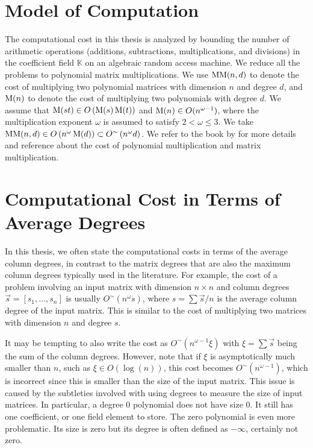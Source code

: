 \section{Model of Computation}

The computational cost in this thesis is analyzed by bounding the
number of arithmetic operations (additions, subtractions, multiplications,
and divisions) in the coefficient field $\mathbb{K}$ on an algebraic
random access machine. We reduce all the problems to polynomial matrix
multiplications. We use $\MM(n,d)$ to denote the cost of multiplying
two polynomial matrices with dimension $n$ and degree $d$, and $\M(n)$
to denote the cost of multiplying two polynomials with degree $d$.
We assume that $\M(st)\in O\left(\M(s)\M(t)\right)$ and $\M(n)\in O(n^{\omega-1})$,
where the multiplication exponent $\omega$ is assumed to satisfy
$2<\omega\le3$. We take $\MM(n,d)\in O\left(n^{\omega}\M(d)\right)\subset O^{\sim}\left(n^{\omega}d\right)$.
We refer to the book by \citet{vonzurgathen} for more details and
reference about the cost of polynomial multiplication and matrix multiplication.


\section{Computational Cost in Terms of Average Degrees}

In this thesis, we often state the computational costs in terms of
the average column degrees, in contrast to the matrix degrees that
are also the maximum column degrees typically used in the literature.
For example, the cost of a problem involving an input matrix with
dimension $n\times n$ and column degrees $\vec{s}=\left[s_{1},\dots,s_{n}\right]$
is usually $O^{\sim}\left(n^{\omega}s\right)$, where $s=\sum\vec{s}/n$
is the average column degree of the input matrix. This is similar
to the cost of multiplying two matrices with dimension $n$ and degree
$s$.

It may be tempting to also write the cost as $O^{\sim}\left(n^{\omega-1}\xi\right)$
with $\xi=\sum\vec{s}$ being the sum of the column degrees. However,
note that if $\xi$ is asymptotically much smaller than $n$, such
as $\xi\in O\left(\log\left(n\right)\right)$, this cost becomes $O^{\sim}\left(n^{\omega-1}\right)$,
which is incorrect since this is smaller than the size of the input
matrix. This issue is caused by the subtleties involved with using
degrees to measure the size of input matrices. In particular, a degree
0 polynomial does not have size 0. It still has one coefficient, or
one field element to store. The zero polynomial is even more problematic.
Its size is zero but its degree is often defined as $-\infty$, certainly
not zero.

